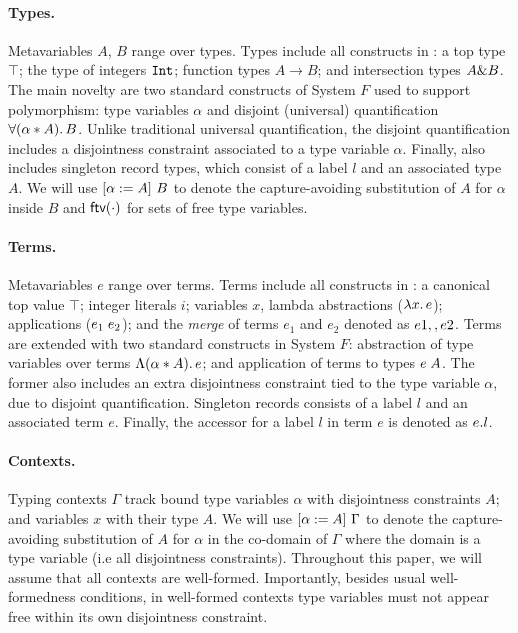 
\paragraph{Types.} 
Metavariables $A$, $B$ range over types. 
Types include all constructs in \oldname: a top type $\top$; 
the type of integers $\tyint$;
function types $A \to B$; and intersection types $A \inter B$.
The main novelty are two standard constructs of System $F$ used to support
polymorphism: 
type variables $\alpha$ and disjoint (universal) quantification $\fordis \alpha A B$. 
Unlike traditional universal quantification, the disjoint
quantification includes a disjointness constraint associated to a type variable $\alpha$.
Finally, \name also includes singleton record types, which consist of a label $l$ and
an associated type $A$.
We will use $\subst {A} \alpha {B}$
to denote the capture-avoiding substitution of $A$ for $\alpha$ inside $B$ and
$\ftv \cdot$ for sets of free type variables. 

\paragraph{Terms.} 
Metavariables $e$ range over terms.  
Terms include all constructs in \oldname: 
a canonical top value $\top$; integer literals $i$;
variables $x$, lambda abstractions ($\lamty x A e$); applications 
($\app {e_1} {e_2}$); and the \emph{merge} of terms $e_1$ and $e_2 $ denoted as 
$e1 \mergeop e2$.
Terms are extended with two standard constructs in System $F$:
abstraction of type variables over terms $\blamdis \alpha A e$; and
application of terms to types $\tapp e A$. 
The former also includes an extra disjointness constraint tied to the type 
variable $\alpha$, due to disjoint quantification.
Singleton records consists of a label $l$ and an associated term $e$.
Finally, the accessor for a label $l$ in term $e$ is denoted as $\recordProj e l$.

\paragraph{Contexts.} Typing contexts $ \Gamma $ track bound type variables
$\alpha$ with disjointness constraints $A$; and variables $x$ with their type $A$. 
We will use $\subst {A} \alpha {\Gamma}$
to denote the capture-avoiding substitution of $A$ for $\alpha$ in the co-domain of
$\Gamma$ where the domain is a type variable (i.e all disjointness constraints).
Throughout this paper, we will assume that all contexts are
well-formed. Importantly, besides usual well-formedness conditions, in
well-formed contexts type variables must not appear free within its own disjointness constraint.
